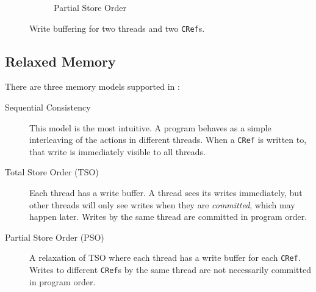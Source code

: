 \begin{figure}[t]
\begin{subfigure}[t]{0.3\textwidth}
    \caption{Partial Store Order}
  \end{subfigure}
  \caption{Write buffering for two threads and two \texttt{CRef}s.}
  \label{fig:wb}
\end{figure}

\subsection{Relaxed Memory}

There are three memory models supported in \dejafu{}:

\begin{description}
\item[Sequential Consistency] This model is the most intuitive.  A program
  behaves as a simple interleaving of the actions in different threads.  When a
  \texttt{CRef} is written to, that write is immediately visible to all
  threads.

\item[Total Store Order (TSO)] Each thread has a write buffer.  A thread sees
  its writes immediately, but other threads will only see writes when they are
  \emph{committed}, which may happen later.  Writes by the same thread are
  committed in program order.

\item[Partial Store Order (PSO)] A relaxation of TSO where each thread has a
  write buffer for each \verb|CRef|.  Writes to different \verb|CRef|s by the
  same thread are not necessarily committed in program order.
\end{description}

